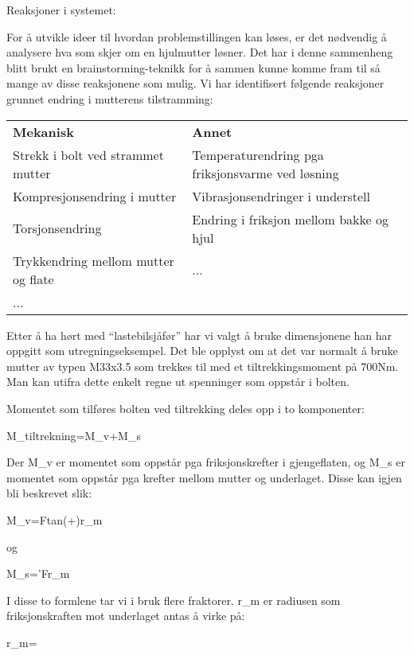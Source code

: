 
Reaksjoner i systemet:

For å utvikle ideer til hvordan problemstillingen kan løses, er det nødvendig å analysere hva som skjer om en hjulmutter løsner. Det har i denne sammenheng blitt brukt en brainstorming-teknikk for å sammen kunne komme fram til så mange av disse reaksjonene som mulig. Vi har identifisert følgende reaksjoner grunnet endring i mutterens tilstramming:

\begin{table}[h]
\begin{tabular}{ll}
\textbf{Mekanisk}                   & \textbf{Annet}                                   \\
Strekk i bolt ved strammet mutter   & Temperaturendring pga friksjonsvarme ved løsning \\
Kompresjonsendring i mutter         & Vibrasjonsendringer i understell                 \\
Torsjonsendring                     & Endring i friksjon mellom bakke og hjul          \\
Trykkendring mellom mutter og flate & ...                                              \\
...                                 &                                                 
\end{tabular}
\end{table}

Etter å ha hørt med “lastebilsjåfør” har vi valgt å bruke dimensjonene han har oppgitt som utregningseksempel. Det ble opplyst om at det var normalt å bruke mutter av typen M33x3.5 som trekkes til med et tiltrekkingsmoment på 700Nm. Man kan utifra dette enkelt regne ut spenninger som oppstår i bolten.

Momentet som tilføres bolten ved tiltrekking deles opp i to komponenter:

M_{tiltrekning}=M_{v}+M_{s}

Der M_{v} er momentet som oppstår pga friksjonskrefter i gjengeflaten, og M_{s} er momentet som oppstår pga krefter mellom mutter og underlaget. Disse kan igjen bli beskrevet slik:

M_{v}=F\cdot tan(\varphi +\varepsilon )\cdot r_{m}

og

M_{s}=\mu 'Fr_{m}

I disse to formlene tar vi i bruk flere fraktorer.  r_{m} er radiusen som friksjonskraften mot underlaget antas å virke på:

r_{m}=

